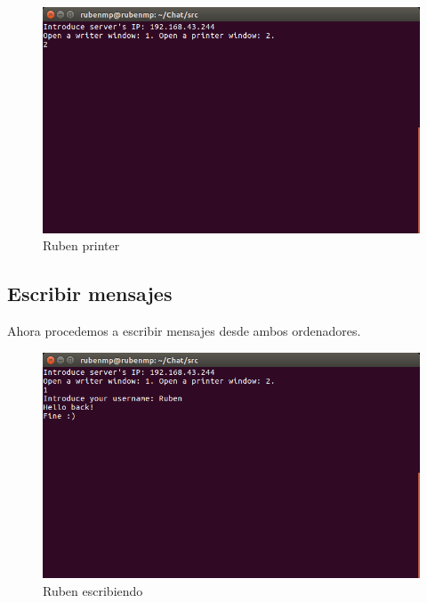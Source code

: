 \begin{figure}[H]
	\includegraphics[scale=0.55]{./Imagenes/rubenprinter1.png}
	\caption{Ruben printer}
\end{figure}


\subsection{Escribir mensajes}
Ahora procedemos a escribir mensajes desde ambos ordenadores.

\begin{figure}[H]
	\includegraphics[scale=0.55]{./Imagenes/rubenwriter2.png}
	\caption{Ruben escribiendo}
\end{figure}

\vspace{0.1cm}

